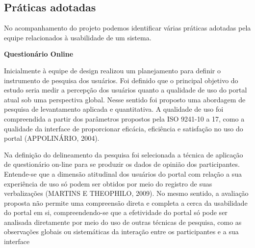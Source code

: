 \subsection{Práticas adotadas}

No acompanhamento do projeto podemos identificar várias práticas adotadas pela equipe relacionados à usabilidade de um sistema.


\textbf{Questionário Online}

Inicialmente à equipe de design realizou um planejamento para definir o instrumento de pesquisa dos usuários. Foi definido que o principal objetivo do estudo seria medir a percepção dos usuários quanto a qualidade de uso do portal atual sob uma perspectiva global. Nesse sentido foi proposto uma abordagem de pesquisa de levantamento aplicada e quantitativa. A qualidade de uso foi compreendida a partir dos parâmetros propostos pela ISO 9241-10 a 17, como a qualidade da interface de proporcionar eficácia, eficiência e satisfação no uso do portal (APPOLINÁRIO, 2004). 

Na definição do delineamento da pesquisa foi selecionada a técnica de aplicação de questionário on-line para se produzir os dados de opinião dos participantes. Entende-se que a dimensão atitudinal dos usuários do portal com relação a sua experiência de uso só podem ser obtidos por meio do registro de suas verbalizações (MARTINS E THEOPHILO, 2009). No mesmo sentido, a avaliação proposta não permite uma compreensão direta e completa a cerca da usabilidade do portal em si, compreendendo-se que a efetividade do portal só pode ser analisada 
diretamente por meio do uso de outras técnicas de pesquisa, como as observações globais ou sistemáticas da interação entre os participantes e a sua interface %


